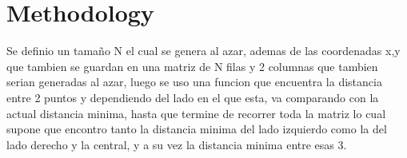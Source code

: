 \section{Methodology}
Se definio un tamaño N el cual se genera al azar, ademas de las coordenadas x,y que tambien se guardan en una matriz de N filas y 2 columnas que tambien serian generadas al azar, luego se uso una funcion que encuentra la distancia entre 2 puntos y dependiendo del lado en el que esta, va comparando con la actual distancia minima, hasta que termine de recorrer toda la matriz lo cual supone que encontro tanto la distancia minima del lado izquierdo como la del lado derecho y la central, y a su vez la distancia minima entre esas 3.